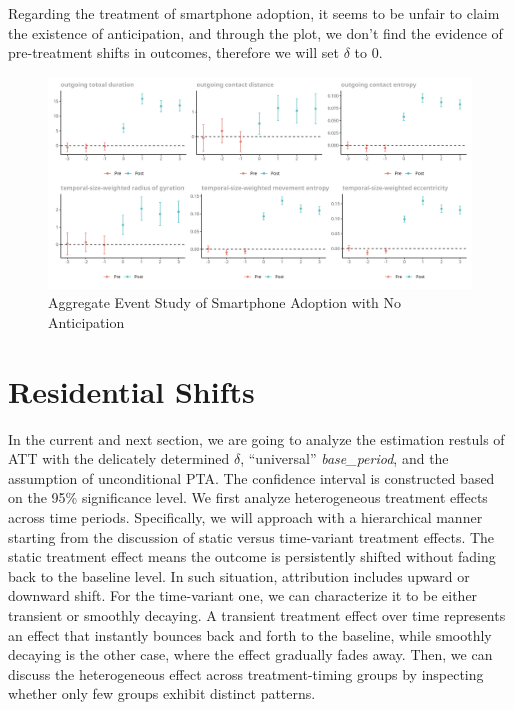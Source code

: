 Regarding the treatment of smartphone adoption, it seems to be unfair to claim the existence of anticipation, and through the plot, we don't find the evidence of pre-treatment shifts in outcomes, therefore we will set $\delta$ to 0.

\begin{figure}[h!]
\centering
\caption{Aggregate Event Study of Smartphone Adoption with No Anticipation}
\vspace{0.1cm}

\includegraphics[width=1\textwidth]{figures/csdid/inspect_delta/smartphone_adoption.png}

\label{fig:select_delta_smartphone_adoption}
\end{figure}

\clearpage\newpage
\section{Residential Shifts}\label{main_res_residential_shift}
In the current and next section, we are going to analyze the estimation restuls of ATT with the delicately determined \( \delta \), ``universal'' \textit{base\_period}, and the assumption of unconditional PTA. The confidence interval is constructed based on the 95\% significance level. We first analyze heterogeneous treatment effects across time periods. Specifically, we will approach with a hierarchical manner starting from the discussion of static versus time-variant treatment effects. The static treatment effect means the outcome is persistently shifted without fading back to the baseline level. In such situation, attribution includes upward or downward shift. For the time-variant one, we can characterize it to be either transient or smoothly decaying. A transient treatment effect over time represents an effect that instantly bounces back and forth to the baseline, while smoothly decaying is the other case, where the effect gradually fades away. Then, we can discuss the heterogeneous effect across treatment-timing groups by inspecting whether only few groups exhibit distinct patterns.


